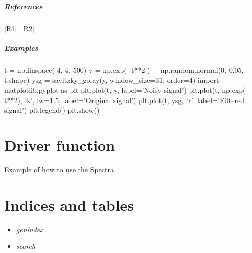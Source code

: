 \documentclass[letterpaper,10pt,english]{sphinxmanual}
\begin{document}
\begin{fulllineitems}
\paragraph{References}

{\hyperref[savitzky_golay:r1]{{[}R1{]}}}, {\hyperref[savitzky_golay:r2]{{[}R2{]}}}
\paragraph{Examples}

t = np.linspace(-4, 4, 500)
y = np.exp( -t**2 ) + np.random.normal(0, 0.05, t.shape)
ysg = savitzky\_golay(y, window\_size=31, order=4)
import matplotlib.pyplot as plt
plt.plot(t, y, label='Noisy signal')
plt.plot(t, np.exp(-t**2), `k', lw=1.5, label='Original signal')
plt.plot(t, ysg, `r', label='Filtered signal')
plt.legend()
plt.show()

\end{fulllineitems}



\chapter{Driver function}
\label{driver_function:driver-function}\label{driver_function::doc}
Example of how to use the Spectra


\chapter{Indices and tables}
\label{index:indices-and-tables}\begin{itemize}
\item {} 
\emph{genindex}

\item {} 
\emph{search}

\end{itemize}

\begin{thebibliography}{R1}
\end{thebibliography}



\renewcommand{\indexname}{Index}
\printindex
\end{document}
